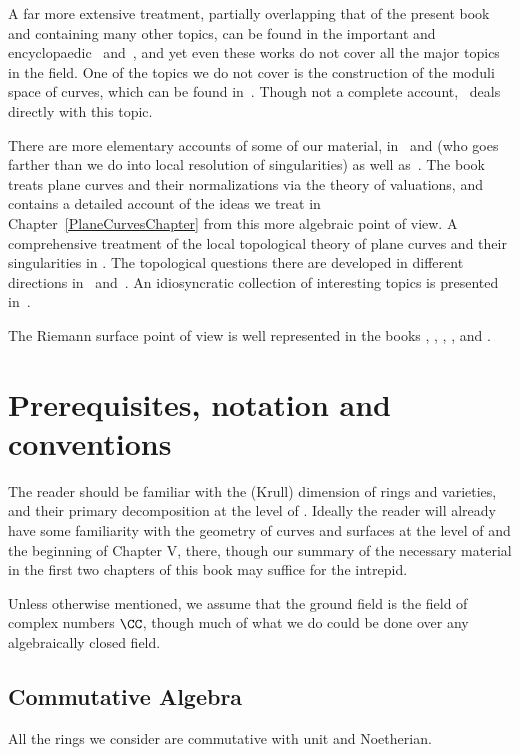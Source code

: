 A far more extensive treatment, partially overlapping that of the present book and containing many other topics, can be found in the important and encyclopaedic~\cite{ACGH} and~\cite{ACG}, and yet even these works do not cover all the major topics in the field. 
One of the topics we do not cover is the construction of the moduli space of curves, which can be found
in~\cite{ACG}. Though not a complete account,~\cite{HarrisMorrison1998} deals directly with this
topic. 

There are more elementary accounts of some of our material, in~\cite{Fulton1989} and \cite{Walker1978} (who goes farther than we do into local resolution of singularities) as well as~\cite{Griffiths-curves}. The book~\cite{Kunz} treats plane curves and their normalizations via the theory of valuations, and contains a detailed  account of the ideas we treat in Chapter~\ref{PlaneCurvesChapter} from this more algebraic point of view.  A comprehensive treatment of the local topological theory of plane curves and their singularities in \cite{Brieskorn1986}. The topological questions there are developed in different directions in~\cite{MR0239612} %
 and~\cite{MR817982}. %
 An  idiosyncratic collection of interesting topics is presented in~\cite{Clemens-Scrapbook}.

 The Riemann surface point of view is well represented in the books \cite{Forster}, \cite{Gunning}, \cite{Gunning-2}, \cite{Kirwan}, and \cite{Miranda}. 


\section{Prerequisites, notation and conventions}
The reader should be familiar with the (Krull) dimension of rings and varieties, and their primary decomposition at the level of \cite{Atiyah-MacDonald}. Ideally the reader  will already have some familiarity with the geometry of curves and surfaces
at the level of \cite[Chapter IV]{Hartshorne1977} and the beginning of Chapter V, there, though our summary of the necessary material in the first two chapters of this book may suffice for the intrepid.

Unless otherwise mentioned, we assume that the ground field is the field of complex numbers $\CC$, though much of what we do
could be done over any algebraically closed field.

\subsection{Commutative Algebra} 
All the rings we consider are commutative with unit and Noetherian.

